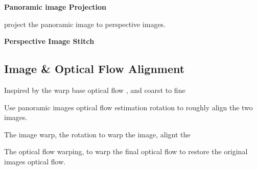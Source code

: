 \textbf{Panoramic image Projection}

project the panoramic image to perspective images.


\textbf{Perspective Image Stitch}



\subsection{Image \& Optical Flow Alignment}

Inspired by the warp base optical flow \cite{?}, and coarst to fine 

Use panoramic images optical flow estimation rotation to roughly align the two images.


The image warp, the rotation to warp the image, alignt the 

The optical flow warping, to warp the final optical flow to restore the original images optical flow.
